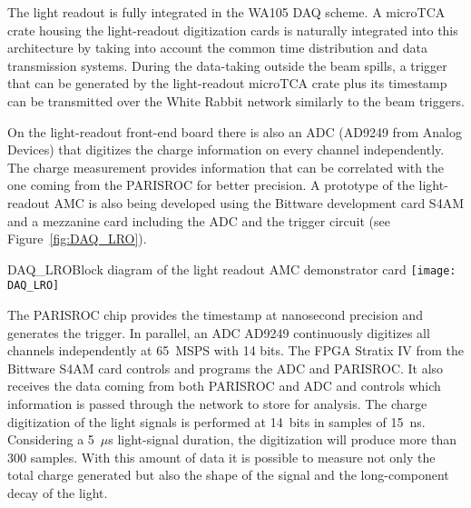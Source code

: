 
The light readout is fully integrated in the WA105 DAQ scheme. A
microTCA crate housing the light-readout digitization cards is
naturally integrated into this architecture by taking into account the
common time distribution and data transmission systems.  During the
data-taking outside the beam spills, a trigger that can be generated
by the light-readout microTCA crate plus its timestamp can be
transmitted over the White Rabbit network similarly to the beam
triggers.

On the light-readout front-end board there is also an ADC (AD9249 from
Analog Devices) that digitizes the charge information on every
channel independently. The charge measurement provides information
that can be correlated with the one  coming from the PARISROC for
better precision. A prototype of the light-readout AMC is also being
developed %
using the Bittware development card S4AM and a
mezzanine card including the ADC and the trigger circuit (see
Figure~\ref{fig:DAQ_LRO}).
\begin{cdrfigure}{DAQ_LRO}{Block diagram of the light readout AMC demonstrator card}
 \texttt{[image: DAQ\_LRO]}  
\end{cdrfigure}
%
The PARISROC chip provides the timestamp at nanosecond precision
and generates the trigger. In parallel,  an ADC AD9249
continuously digitizes all channels independently at 65~MSPS
with 14 bits. The FPGA Stratix IV from the Bittware S4AM card controls
and programs the ADC and PARISROC. It also receives the data coming
from both PARISROC and ADC and controls which information is
passed through the network to store for analysis.  The charge
digitization of the light signals is performed at 14~bits in samples
of 15~ns. Considering a 5~$\mu$s light-signal duration, the
digitization will produce more than 300 samples. With this amount of
data it is possible to measure not only the total charge generated but
also the shape of the signal and the long-component decay of the light. 


